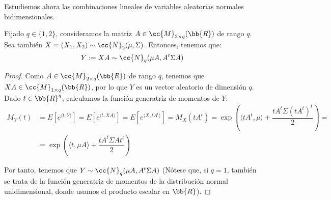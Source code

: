 Estudiemos ahora las combinaciones lineales de variables aleatorias normales bidimensionales.
\begin{prop}
    Fijado $q\in \{1,2\}$, consideramos la matriz $A\in \cc{M}_{2\times q}(\bb{R})$ de rango $q$. Sea también $X=(X_1, X_2)\sim \cc{N}_2(\mu, \Sigma)$. Entonces, tenemos que:
    \begin{equation*}
        Y:=XA\sim \cc{N}_q(\mu A, A^t\Sigma A)
    \end{equation*}
\end{prop}
\begin{proof}
    Como $A\in \cc{M}_{2\times q}(\bb{R})$ de rango $q$, tenemos que $XA\in \cc{M}_{1\times q}(\bb{R})$, por lo que $Y$ es un vector aleatorio de dimensión $q$. Dado $t\in \bb{R}^q$, calculamos la función generatriz de momentos de $Y$:
    \begin{align*}
        M_Y(t)&=E\left[e^{\langle t, Y\rangle}\right]
        = E\left[e^{\langle t, XA\rangle}\right]
        = E\left[e^{\langle X, tA^t\rangle}\right]
        = M_X(tA^t)
        = \exp\left(\langle tA^t,\mu\rangle+\dfrac{tA^t\Sigma (tA^t)^t}{2}\right)
        =\\&= \exp\left(\langle t,\mu A\rangle+\dfrac{tA^t\Sigma A t^t}{2}\right)
    \end{align*}

    Por tanto, tenemos que $Y\sim \cc{N}_q(\mu A, A^t\Sigma A)$ (Nótese que, si $q=1$, también se trata de la función generatriz de momentos de la distribución normal unidimensional, donde usamos el producto escalar en $\bb{R}$).
\end{proof}

